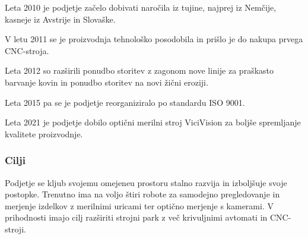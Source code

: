Leta 2010 je podjetje začelo dobivati naročila iz tujine,
najprej iz Nemčije, kasneje iz Avstrije in Slovaške.

V letu 2011 se je proizvodnja tehnološko posodobila 
in prišlo je do nakupa prvega CNC-stroja.

Leta 2012 so razširili ponudbo storitev z zagonom nove linije za praškasto barvanje
kovin in ponudbo storitev na novi žični eroziji.

Leta 2015 pa se je podjetje reorganiziralo po standardu ISO 9001.

Leta 2021 je podjetje dobilo optični merilni stroj ViciVision za boljše spremljanje
kvalitete proizvodnje.

\subsubsection{Cilji}
Podjetje se kljub svojemu omejeneu prostoru stalno razvija in izboljšuje
svoje postopke. Trenutno ima na voljo štiri robote za samodejno pregledovanje
in merjenje izdelkov z merilnimi uricami ter optično merjenje s kamerami.
V prihodnosti imajo cilj razširiti strojni park z več krivuljnimi avtomati
in CNC-stroji.
